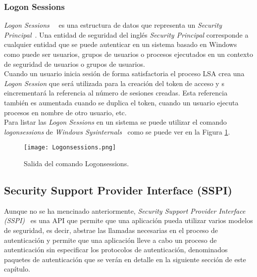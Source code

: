 \subsubsection{Logon Sessions}

{\it Logon Sessions}~\cite{Capitulo2:LogonSessions}~\cite{Capitulo2:LogonSessions2} es una estructura de datos que representa un {\it Security Principal}~\cite{Capitulo2:SecurityPrincipals}. Una entidad de seguridad del inglés {\it Security Principal} corresponde a cualquier entidad que se puede autenticar en un sistema basado en Windows como puede ser usuarios, grupos de usuarios o procesos ejecutados en un contexto de seguridad de usuarios o grupos de usuarios. \\

Cuando un usuario inicia sesión de forma satisfactoria el proceso LSA crea una {\it Logon Session} que será utilizada para la creación del token de acceso y s eincrementará la referencia al número de sesiones creadas. Esta referencia también es aumentada cuando se duplica el token, cuando un usuario ejecuta procesos en nombre de otro usuario, etc. \\

Para listar las  {\it Logon Sessions} en un sistema se puede utilizar el comando {\it logonsessions} de {\it Windows Sysinternals}~\cite{Capitulo2:Sysinternals} como se puede ver en la Figura \ref{Logonsessions}.

\begin{figure}[t!] %
\begin{center}
\texttt{[image: Logonsessions.png]}
\end{center}
\caption{Salida del comando Logonsessions.}
\label{Logonsessions}
\end{figure}


\subsection{Security Support Provider Interface (SSPI)}

Aunque no se ha mencinado anteriormente, {\it Security Support Provider Interface (SSPI)}~\cite{Capitulo2:SSPI} es una API que permite que una aplicación pueda utilizar varios modelos de seguridad, es decir, abstrae las llamadas necesarias en el proceso de autenticación y permite que una aplicación lleve a cabo un proceso de autenticación sin especificar los protocolos de autenticación, denominados paquetes de autenticación que se verán en detalle en la siguiente sección de este capítulo.\\

